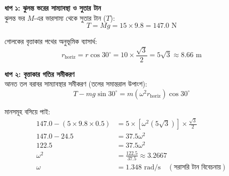\documentclass[12pt, a4paper]{article}
\begin{document}
\begin{tcolorbox}[solutionbox={সমাধান (Solution)}]
    \noindent
    \textbf{ধাপ ১: ঝুলন্ত ভরের সাম্যাবস্থা ও সুতার টান} \\
    ঝুলন্ত ভর $M$-এর ভারসাম্য থেকে সুতার টান ($T$):
    \[ T = M g = 15 \times 9.8 = 147.0\text{ N} \]
    
    গোলকের বৃত্তাকার পথের অনুভূমিক ব্যাসার্ধ:
    \[ r_{\text{horiz}} = r \cos 30^\circ = 10 \times \frac{\sqrt{3}}{2} = 5\sqrt{3} \approx 8.66\text{ m} \]
    
    \vspace{0.5em}
    \noindent\textbf{ধাপ ২: বৃত্তাকার গতির সমীকরণ} \\
    আনত তল বরাবর সাম্যাবস্থার সমীকরণ (তলের সমান্তরাল উপাংশ):
    \[ T - m g \sin 30^\circ = m (\omega^2 r_{\text{horiz}}) \cos 30^\circ \]
    
    মানসমূহ বসিয়ে পাই:
    \begin{align*}
        147.0 - (5 \times 9.8 \times 0.5) &= 5 \times [\omega^2 (5\sqrt{3})] \times \frac{\sqrt{3}}{2} \\
        147.0 - 24.5 &= 37.5 \omega^2 \\
        122.5 &= 37.5 \omega^2 \\
        \omega^2 &= \frac{122.5}{37.5} \approx 3.2667 \\
        \omega &= \mathbf{1.348}\text{ rad/s} \quad (\text{সরাসরি টান বিবেচনায়})
    \end{align*}
\end{tcolorbox}

\newpage
\end{document}
